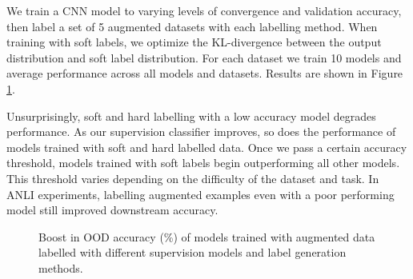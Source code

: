 We train a CNN model to varying levels of convergence and validation accuracy, then label a set of 5 augmented datasets with each labelling method.
When training with soft labels, we optimize the KL-divergence between the output distribution and soft label distribution.
For each dataset we train 10 models and average performance across all models and datasets.
Results are shown in Figure \ref{fig:label_gen_exp}.

Unsurprisingly, soft and hard labelling with a low accuracy model degrades performance.
As our supervision classifier improves, so does the performance of models trained with soft and hard labelled data.
Once we pass a certain accuracy threshold, models trained with soft labels begin outperforming all other models.
This threshold varies depending on the difficulty of the dataset and task.
In ANLI experiments, labelling augmented examples even with a poor performing model still improved downstream accuracy.



\begin{figure}[t]
\centering
{}
\caption{Boost in OOD accuracy (\%) of models trained with augmented data labelled with different supervision models and label generation methods.}
\label{fig:label_gen_exp}
\end{figure}

